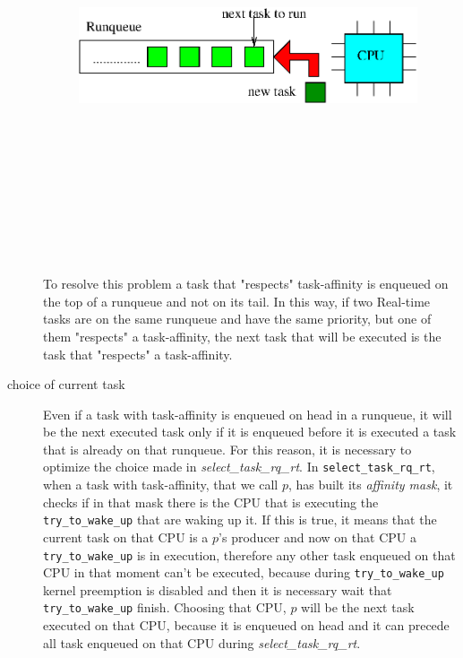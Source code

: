 \begin{description}
\begin{figure}[htbp]
\centering
\includegraphics[width=10cm,height=12cm, keepaspectratio]{images/enq_head.eps}
\caption{}
\label{fig:enq_head}
\end{figure}

To resolve this problem a task that "respects" task-affinity is enqueued on the top of a runqueue and not on its tail. In this way, if two Real-time tasks 
are on the same runqueue and have the same priority, but one of them "respects" a task-affinity, the next task that will be executed is the task that 
"respects" a task-affinity. 

\item[choice of current task] Even if a task with task-affinity is enqueued on head in a runqueue, it will be the next executed task only if it is 
enqueued before it is executed a task that is already on that runqueue. For this reason, it is necessary to optimize the choice made in 
\textit{select\_task\_rq\_rt}. In \texttt{select\_task\_rq\_rt}, when a task with task-affinity, that we call $p$, has built its \textit{affinity mask}, 
it checks if in that mask there is the CPU that is executing the \texttt{try\_to\_wake\_up} that are waking up it. If this is true, it means that the 
current task on that CPU is a $p$'s producer and now on that CPU a \texttt{try\_to\_wake\_up} is in execution, therefore any other task enqueued on that 
CPU in that moment can't be executed, because during \texttt{try\_to\_wake\_up} kernel preemption is disabled and then it is necessary wait that 
\texttt{try\_to\_wake\_up} finish. Choosing that CPU, $p$ will be the next task executed on that CPU, because it is enqueued on head and it can precede 
all task enqueued on that CPU during \textit{select\_task\_rq\_rt}.


\end{description}
